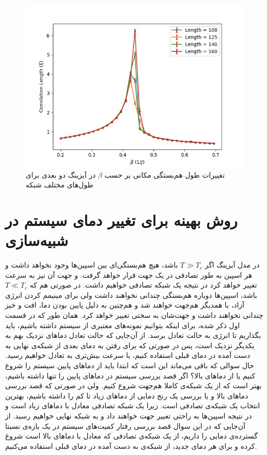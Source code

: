 \documentclass[11pt, a4paper]{article}
\begin{document}
\begin{figure}[h!]
\begin{minipage}[b]{0.48\textwidth}
  \end{minipage}
  \hfill
  \begin{minipage}[b]{0.48\textwidth}
    \includegraphics[width=\textwidth]{ising_render_data_xi[108, 125, 140, 160]_0.2_0.695_0.015_100.jpg}
    \caption{تغییرات طول هم‌بستگی مکانی بر حسب $\beta$ در آیزینگ دو بعدی برای طول‌های مختلف شبکه}
    \label{fig:ising_xi}
  \end{minipage}
  \hfill
\end{figure}


\section{\textbf{روش بهینه برای تغییر دمای سیستم در شبیه‌سازی}}
در مدل آیزینگ اگر
$T \gg T_c$
باشد، هیچ هم‌بستگی‌ای بین اسپین‌ها وجود نخواهد داشت و هر اسپین به طور تصادفی در یک جهت قرار خواهد گرفت. و جهت آن نیز به سرعت تغییر خواهد کرد
در نتیجه یک شبکه تصادفی خواهیم داشت.
در صورتی هم که
$T \ll T_c$
باشد، اسپین‌ها دوباره هم‌بستگی چندانی نخواهند داشت ولی برای مینیمم کردن انرژی آزاد،
با همدیگر هم‌جهت خواهند شد و هم‌چنین به دلیل پایین بودن دما،
افت و خیز چندانی نخواهند داشت و جهت‌شان به سختی تغییر خواهد کرد.
همان طور که در قسمت اول ذکر شده،
برای اینکه بتوانیم نمونه‌های معتبری از سیستم داشته باشیم،
باید بگذاریم تا انرژی به حالت تعادل برسد.
از آن‌جایی که حالت تعادل دماهای نزدیک بهم به یکدیگر نزدیک است،
پس در صورتی که برای رفتن به دمای بعدی از شبکه‌ی نهایی به دست آمده در دمای قبلی استفاده کنیم،
با سرعت بیش‌تری به تعادل خواهیم رسید.
حال سوالی که باقی می‌ماند این است که ابتدا باید از دما‌های پایین سیستم را شروع کنیم یا از دماهای بالا؟
اگر قصد بررسی سیستم در دماهای پایین را تنها داشته باشیم،
بهتر است که از یک شبکه‌ی کاملا هم‌جهت شروع کنیم.
ولی در صورتی که قصد بررسی دماهای بالا و یا بررسی یک رنج دمایی از دماهای زیاد تا کم را داشته باشیم،
بهترین انتخاب یک شبکه‌ی تصادفی است.
زیرا یک شبکه تصادفی معادل با دماهای زیاد است و در نتیجه اسپین‌ها به راحتی تغییر جهت خواهند داد و به شبکه نهایی خواهیم رسید.
از آن‌جایی که در این سوال قصد بررسی رفتار کمیت‌های سیستم در یک بازه‌ی نسبتا گسترده‌ی دمایی را داریم،
از یک شبکه‌ی تصادفی که معادل با دماهای بالا است شروع کرده و برای هر دمای جدید،
از شبکه‌ی به دست آمده در دمای قبلی استفاده می‌کنیم.
\end{document}
